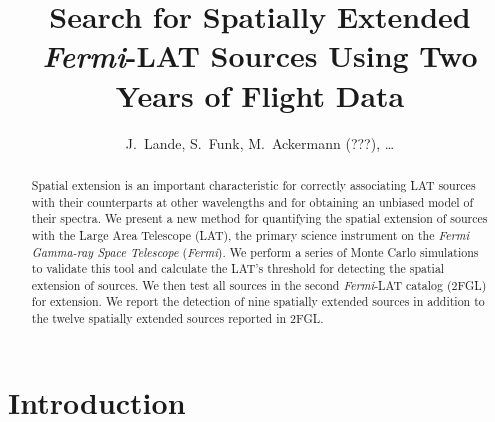 \documentclass[12pt,preprint]{aastex}
\newcommand{\fermi}{\textit{Fermi}\xspace}
\newcommand{\hl}[1]{#1}
\begin{document}
\title{Search for Spatially Extended \fermi-LAT Sources Using Two Years of Flight
Data}


\author{
J.~Lande,
S.~Funk,
M.~Ackermann (???),
\ldots
{}
}


\begin{abstract}
\hl{
Spatial extension is an important characteristic for correctly
associating LAT sources with their counterparts at other wavelengths
and for obtaining an unbiased model of their spectra.  We present a new
method for quantifying the spatial extension of sources with the Large
Area Telescope (LAT), the primary science instrument on the {\em \fermi
Gamma-ray Space Telescope} (\fermi).  We perform a series of Monte Carlo
simulations to validate this tool and calculate the LAT's threshold for
detecting the spatial extension of sources.  We then test all sources
in the second \fermi-LAT catalog (2FGL) for extension. We report the
detection of nine spatially extended sources in addition to the twelve
spatially extended sources reported in 2FGL.
}
\end{abstract}

\section{Introduction}
\end{document}
